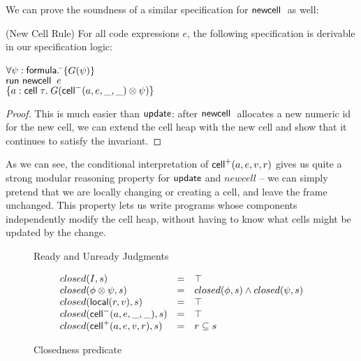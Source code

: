 \documentclass[natbib]{sigplanconf}
\begin{document}
We can prove the soundness of a similar specification for $\mbox{\textsf{{newcell}}}\;$ as
well:

\begin{prop}{(New Cell Rule)}
For all code expressions $e$, the following specification is derivable in
our specification logic: 
\begin{tabbing}
$\forall \psi:\mbox{\textsf{{formula}}}.\; $\=$\{{G(\psi)}\}$ \\
                           \>$\mbox{\textsf{{run }}}{\mbox{\textsf{{newcell}}}\;\;e}$ \\
                           \>$\{{a:\mbox{\textsf{{cell}}}\;{\tau}.\; G(\mbox{\textsf{{cell}}}^{-}({a}, {e}, {\_}, {\_}) \otimes \psi)}\}$
\end{tabbing}
\end{prop}

\begin{proof}
This is much easier than $\mbox{\textsf{{update}}}$: after $\mbox{\textsf{{newcell}}}\;$ allocates a new
numeric id for the new cell, we can extend the cell heap with the new 
cell and show that it continues to satisfy the invariant. 
\end{proof}

As we can see, the conditional interpretation of $\mbox{\textsf{{cell}}}^{+}({a}, {e}, {v}, {r})$
gives us quite a strong modular reasoning property for $\mbox{\textsf{{update}}}$ and
$newcell$ -- we can simply pretend that we are locally changing or
creating a cell, and leave the frame unchanged. This property lets us write 
programs whose components independently modify the cell heap, without
having to know what cells might be updated by the change. 

\begin{figure}
{\small
{}
}
\caption{Ready and Unready Judgments}
\label{readiness}
\end{figure}

\begin{figure}
{\small
  \begin{displaymath}
    \begin{array}{lcl}
      closed(I, s) & = & \top \\
      closed(\phi \otimes \psi, s) & = & closed(\phi, s) \land closed(\psi, s) \\ 
      closed(\mbox{\textsf{{local}}}({r}, {v}), s) & = & \top \\
      closed(\mbox{\textsf{{cell}}}^{-}({a}, {e}, {\_}, {\_}), s) & = & \top \\
      closed(\mbox{\textsf{{cell}}}^{+}({a}, {e}, {v}, {r}), s) & = & r \subseteq s \\
    \end{array}
  \end{displaymath}
}
\caption{Closedness predicate}
\label{closedness}  
\end{figure}
\end{document}
